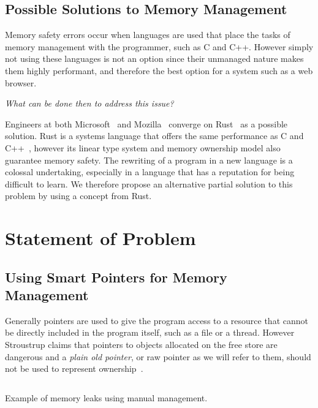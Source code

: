 \documentclass{proposal}
\begin{document}
    \subsection{Possible Solutions to Memory Management}\label{subsec:possible-solutions-to-memory-management}

    Memory safety errors occur when languages are used that place the tasks of memory management with the programmer, such as C and C++.
    However simply not using these languages is not an option since their unmanaged nature makes them highly performant, and therefore the best option for a system such as a web browser.

    \emph{What can be done then to address this issue?}

    Engineers at both Microsoft~\cite{Thomas2019} and Mozilla~\cite{Hostfelt2019} converge on Rust~\cite{Balasubramanian2017} as a possible solution.
    Rust is a systems language that offers the same performance as C and C++~\cite{Lin2016}, however its linear type system and memory ownership model also guarantee memory safety.
    The rewriting of a program in a new language is a colossal undertaking, especially in a language that has a reputation for being difficult to learn.
    We therefore propose an alternative partial solution to this problem by using a concept from Rust.




    \section{Statement of Problem}\label{sec:statement-of-problem}

    \subsection{Using Smart Pointers for Memory Management}\label{subsec:using-smart-pointers-for-memory-management}

    Generally pointers are used to give the program access to a resource that cannot be directly included in the program itself, such as a file or a thread.
    However Stroustrup claims that pointers to objects allocated on the free store are dangerous and a \emph{plain old pointer}, or raw pointer as we will refer to them, should not be used to represent ownership~\cite{Stroustrup2018}.

    \begin{listing}
        \inputminted{c++}{code/manual-leak.cpp}
        \caption{Example of memory leaks using manual management.}
        \label{lst:manual-leak}
    \end{listing}
\end{document}
